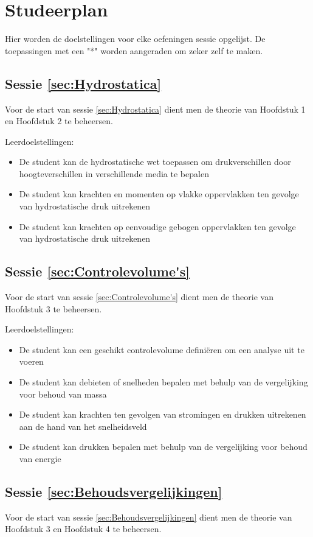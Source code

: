 \chapter{Studeerplan}
Hier worden de doelstellingen voor elke oefeningen sessie opgelijst. De toepassingen met een "*" worden aangeraden om zeker zelf te maken.
	\section*{Sessie \ref{sec:Hydrostatica}}
Voor de start van sessie \ref{sec:Hydrostatica} dient men de theorie van Hoofdstuk 1 en Hoofdstuk 2 te beheersen.

Leerdoelstellingen:
\begin{itemize}
	\item De student kan de hydrostatische wet toepassen om drukverschillen door hoogteverschillen in verschillende media te bepalen
	\item De student kan krachten en momenten op vlakke oppervlakken ten gevolge van hydrostatische druk uitrekenen
	\item De student kan krachten op eenvoudige gebogen oppervlakken ten gevolge van hydrostatische druk uitrekenen
\end{itemize}
	
	\section*{Sessie \ref{sec:Controlevolume's}}
Voor de start van sessie \ref{sec:Controlevolume's} dient men de theorie van Hoofdstuk 3 te beheersen.

Leerdoelstellingen:
\begin{itemize}
	\item De student kan een geschikt controlevolume definiëren om een analyse uit te voeren
	\item De student kan debieten of snelheden bepalen met behulp van de vergelijking voor behoud van massa
	\item De student kan krachten ten gevolgen van stromingen en drukken uitrekenen aan de hand van het snelheidsveld
	\item De student kan drukken bepalen met behulp van de vergelijking voor behoud van energie
\end{itemize}

	\section*{Sessie \ref{sec:Behoudsvergelijkingen}}
Voor de start van sessie \ref{sec:Behoudsvergelijkingen} dient men de theorie van Hoofdstuk 3 en Hoofdstuk 4 te beheersen.


